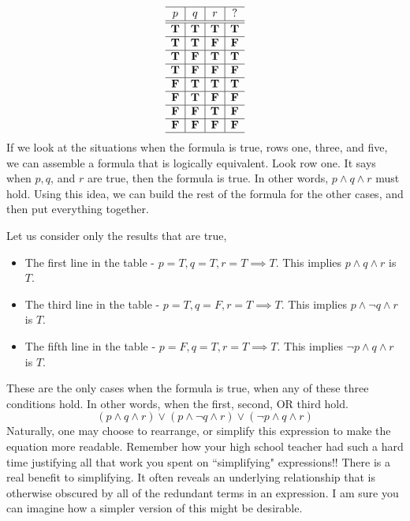 \begin{problem}
\[  \begin{array}{c|c|c|c}
  \hline  
  p & q &r	& ? \\
  \hline
  \hline
 \mathbf{T} &  \mathbf{T} 	&  \mathbf{T} 		&  \mathbf{T}\\
  \hline
 \mathbf{T} &  \mathbf{T} 	&  \mathbf{F}  		&  \mathbf{F}\\
  \hline
 \mathbf{T} &  \mathbf{F} 	&  \mathbf{T}  		&  \mathbf{T}\\
  \hline
 \mathbf{T} &  \mathbf{F} 	&  \mathbf{F}  		&  \mathbf{F}\\
    \hline
 \mathbf{F} &  \mathbf{T} 	&  \mathbf{T} 		&  \mathbf{T}\\
  \hline
 \mathbf{F} &  \mathbf{T} 	&  \mathbf{F}  		&  \mathbf{F}\\
  \hline
 \mathbf{F} &  \mathbf{F} 	&  \mathbf{T}  		&  \mathbf{F}\\
  \hline
 \mathbf{F} &  \mathbf{F} 	&  \mathbf{F}  		&  \mathbf{F}\\
    \hline
    \end{array}\]
If we look at the situations when the formula is true, rows one, three, and five, we  can assemble a formula that is logically equivalent.    Look row one.  It says when $p, q$, and $r$ are true, then the formula is true.  In other words, $p\land q \land r$ must hold.  Using this idea, we can build the rest of the formula for the other cases, and then put everything together.


\ifKey
\color{red}
Let us consider only the results that are true, 
\begin{itemize}
\item The first line in the table - $p =T, q = T, r = T \implies T$.  This implies $p \land q \land r$ is $T$.
\item The third line in the table - $p =T, q = F, r = T \implies T$.  This implies $p \land \neg q \land r$ is $T$.
\item The fifth line in the table - $p =F, q = T, r = T \implies T$.  This implies $\neg p \land  q \land r$ is $T$.
\end{itemize}
These are the only cases when the formula is true, when any of these three conditions hold.  In other words, when the first, second, OR third hold.
$$(p \land q \land r) \lor (p \land \neg q \land r) \lor (\neg p \land  q \land r)$$
Naturally, one may choose to rearrange, or simplify this expression to make the equation more readable.  Remember how your high school teacher had such a hard time justifying all that work you spent on ``simplifying" expressions!!  There is a real benefit to simplifying.  It often reveals an underlying relationship that is otherwise obscured by all of the redundant terms in an expression.  I am sure you can imagine how a simpler version of this might be desirable.
\color{black}
\fi
\end{problem}


